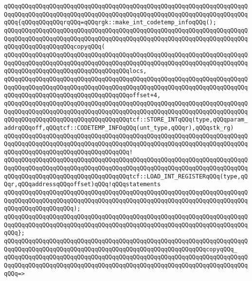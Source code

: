 \verb|qQQqqQQqqQQqqQQqqQQqqQQqqQQqqQQqqQQqqQQqqQQqqQQqqQQqqQQqqQQqqQQqqQQqqQQqqQQqqQQqqQQqqQQqqQQqqQQqqQQqqQQqqQQqqQQqqQQqqQQqqQQqqQQqqQQqqQQqqQQqqQQq{qQQqqQQqqQQqrqQQq=qQQqrgk::make_int_codetemp_infoqQQq();|\newline
\newline
\verb|qQQqqQQqqQQqqQQqqQQqqQQqqQQqqQQqqQQqqQQqqQQqqQQqqQQqqQQqqQQqqQQqqQQqqQQqqQQqqQQqqQQqqQQqqQQqqQQqqQQqqQQqqQQqqQQqqQQqqQQqqQQqqQQqqQQqqQQqqQQqqQQqqQQqqQQqqQQqqQQqcopyqQQq(|\newline
\verb|qQQqqQQqqQQqqQQqqQQqqQQqqQQqqQQqqQQqqQQqqQQqqQQqqQQqqQQqqQQqqQQqqQQqqQQqqQQqqQQqqQQqqQQqqQQqqQQqqQQqqQQqqQQqqQQqqQQqqQQqqQQqqQQqqQQqqQQqqQQqqQQqqQQqqQQqqQQqqQQqqQQqqQQqqQQqqQQqlocs,|\newline
\verb|qQQqqQQqqQQqqQQqqQQqqQQqqQQqqQQqqQQqqQQqqQQqqQQqqQQqqQQqqQQqqQQqqQQqqQQqqQQqqQQqqQQqqQQqqQQqqQQqqQQqqQQqqQQqqQQqqQQqqQQqqQQqqQQqqQQqqQQqqQQqqQQqqQQqqQQqqQQqqQQqqQQqqQQqqQQqqQQqoffset+4,|\newline
\newline
\verb|qQQqqQQqqQQqqQQqqQQqqQQqqQQqqQQqqQQqqQQqqQQqqQQqqQQqqQQqqQQqqQQqqQQqqQQqqQQqqQQqqQQqqQQqqQQqqQQqqQQqqQQqqQQqqQQqqQQqqQQqqQQqqQQqqQQqqQQqqQQqqQQqqQQqqQQqqQQqqQQqqQQqqQQqqQQqqQQqtcf::STORE_INTqQQq(type,qQQqparam_addrqQQqoff,qQQqtcf::CODETEMP_INFOqQQq(unt_type,qQQqr),qQQqstk_rg)|\newline
\verb|qQQqqQQqqQQqqQQqqQQqqQQqqQQqqQQqqQQqqQQqqQQqqQQqqQQqqQQqqQQqqQQqqQQqqQQqqQQqqQQqqQQqqQQqqQQqqQQqqQQqqQQqqQQqqQQqqQQqqQQqqQQqqQQqqQQqqQQqqQQqqQQqqQQqqQQqqQQqqQQqqQQqqQQqqQQqqQQq!|\newline
\verb|qQQqqQQqqQQqqQQqqQQqqQQqqQQqqQQqqQQqqQQqqQQqqQQqqQQqqQQqqQQqqQQqqQQqqQQqqQQqqQQqqQQqqQQqqQQqqQQqqQQqqQQqqQQqqQQqqQQqqQQqqQQqqQQqqQQqqQQqqQQqqQQqqQQqqQQqqQQqqQQqqQQqqQQqqQQqqQQqtcf::LOAD_INT_REGISTERqQQq(type,qQQqr,qQQqaddressqQQqoffset)qQQq!qQQqstatements|\newline
\verb|qQQqqQQqqQQqqQQqqQQqqQQqqQQqqQQqqQQqqQQqqQQqqQQqqQQqqQQqqQQqqQQqqQQqqQQqqQQqqQQqqQQqqQQqqQQqqQQqqQQqqQQqqQQqqQQqqQQqqQQqqQQqqQQqqQQqqQQqqQQqqQQqqQQqqQQqqQQqqQQq);|\newline
\verb|qQQqqQQqqQQqqQQqqQQqqQQqqQQqqQQqqQQqqQQqqQQqqQQqqQQqqQQqqQQqqQQqqQQqqQQqqQQqqQQqqQQqqQQqqQQqqQQqqQQqqQQqqQQqqQQqqQQqqQQqqQQqqQQqqQQqqQQqqQQqqQQq};|\newline
\newline
\verb|qQQqqQQqqQQqqQQqqQQqqQQqqQQqqQQqqQQqqQQqqQQqqQQqqQQqqQQqqQQqqQQqqQQqqQQqqQQqqQQqqQQqqQQqqQQqqQQqqQQqqQQqqQQqqQQqqQQqqQQqqQQqqQQqcopyqQQq_|\newline
\verb|qQQqqQQqqQQqqQQqqQQqqQQqqQQqqQQqqQQqqQQqqQQqqQQqqQQqqQQqqQQqqQQqqQQqqQQqqQQqqQQqqQQqqQQqqQQqqQQqqQQqqQQqqQQqqQQqqQQqqQQqqQQqqQQqqQQqqQQqqQQqqQQq=>|\newline
